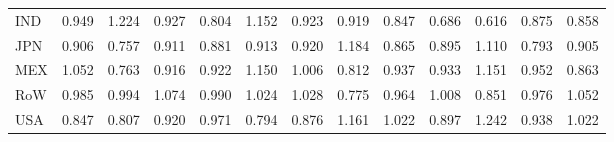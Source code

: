\begin{table}[htbp]
\begin{tabular}{lcccccccccccc}
  IND & \textcolor[RGB]{110,72,144}{0.949} & \textcolor[RGB]{2,1,253}{1.224} & \textcolor[RGB]{134,87,121}{0.927} & \textcolor[RGB]{227,147,28}{0.804} & \textcolor[RGB]{15,10,240}{1.152} & \textcolor[RGB]{140,91,115}{0.923} & \textcolor[RGB]{149,96,106}{0.919} & \textcolor[RGB]{215,139,40}{0.847} & \textcolor[RGB]{249,161,6}{0.686} & \textcolor[RGB]{251,162,4}{0.616} & \textcolor[RGB]{198,128,57}{0.875} & \textcolor[RGB]{206,133,49}{0.858} \\ 
  JPN & \textcolor[RGB]{166,107,89}{0.906} & \textcolor[RGB]{244,158,11}{0.757} & \textcolor[RGB]{157,102,98}{0.911} & \textcolor[RGB]{193,125,62}{0.881} & \textcolor[RGB]{155,100,100}{0.913} & \textcolor[RGB]{147,95,108}{0.920} & \textcolor[RGB]{8,5,246}{1.184} & \textcolor[RGB]{200,129,55}{0.865} & \textcolor[RGB]{187,121,68}{0.895} & \textcolor[RGB]{30,19,225}{1.110} & \textcolor[RGB]{234,151,21}{0.793} & \textcolor[RGB]{172,111,83}{0.905} \\ 
  MEX & \textcolor[RGB]{38,25,217}{1.052} & \textcolor[RGB]{240,155,15}{0.763} & \textcolor[RGB]{151,98,104}{0.916} & \textcolor[RGB]{142,92,113}{0.922} & \textcolor[RGB]{19,12,236}{1.150} & \textcolor[RGB]{68,44,187}{1.006} & \textcolor[RGB]{221,143,34}{0.812} & \textcolor[RGB]{121,78,134}{0.937} & \textcolor[RGB]{128,82,128}{0.933} & \textcolor[RGB]{17,11,238}{1.151} & \textcolor[RGB]{104,67,151}{0.952} & \textcolor[RGB]{202,131,53}{0.863} \\ 
  RoW & \textcolor[RGB]{81,52,174}{0.985} & \textcolor[RGB]{77,50,178}{0.994} & \textcolor[RGB]{34,22,221}{1.074} & \textcolor[RGB]{79,51,176}{0.990} & \textcolor[RGB]{55,36,200}{1.024} & \textcolor[RGB]{53,34,202}{1.028} & \textcolor[RGB]{238,154,17}{0.775} & \textcolor[RGB]{98,63,157}{0.964} & \textcolor[RGB]{66,43,189}{1.008} & \textcolor[RGB]{210,136,45}{0.851} & \textcolor[RGB]{91,59,164}{0.976} & \textcolor[RGB]{42,27,212}{1.052} \\ 
  USA & \textcolor[RGB]{217,140,38}{0.847} & \textcolor[RGB]{225,146,30}{0.807} & \textcolor[RGB]{144,94,110}{0.920} & \textcolor[RGB]{94,61,162}{0.971} & \textcolor[RGB]{232,150,23}{0.794} & \textcolor[RGB]{195,126,60}{0.876} & \textcolor[RGB]{13,8,242}{1.161} & \textcolor[RGB]{57,37,198}{1.022} & \textcolor[RGB]{183,118,72}{0.897} & \textcolor[RGB]{0,0,255}{1.242} & \textcolor[RGB]{119,77,136}{0.938} & \textcolor[RGB]{59,38,196}{1.022} \\ 
   \hline
\end{tabular}
\end{table}
